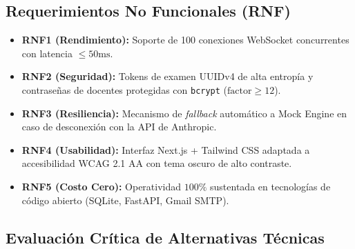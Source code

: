\documentclass[11pt,a4paper]{article}
\begin{document}
\subsection{Requerimientos No Funcionales (RNF)}
\begin{itemize}[leftmargin=*]
    \item \textbf{RNF1 (Rendimiento):} Soporte de 100 conexiones WebSocket concurrentes con latencia $\le 50\text{ms}$.
    \item \textbf{RNF2 (Seguridad):} Tokens de examen UUIDv4 de alta entropía y contraseñas de docentes protegidas con \texttt{bcrypt} ($\text{factor} \ge 12$).
    \item \textbf{RNF3 (Resiliencia):} Mecanismo de \textit{fallback} automático a Mock Engine en caso de desconexión con la API de Anthropic.
    \item \textbf{RNF4 (Usabilidad):} Interfaz Next.js + Tailwind CSS adaptada a accesibilidad WCAG 2.1 AA con tema oscuro de alto contraste.
    \item \textbf{RNF5 (Costo Cero):} Operatividad $100\%$ sustentada en tecnologías de código abierto (SQLite, FastAPI, Gmail SMTP).
\end{itemize}

\subsection{Evaluación Crítica de Alternativas Técnicas}
\end{document}
